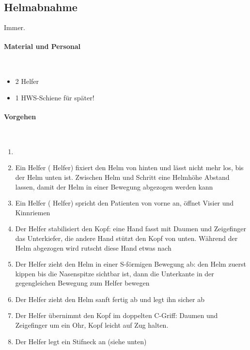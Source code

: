 \subsection{Helmabnahme}
\label{topic:helmabnahme}

Immer.

\paragraph*{Material und Personal}~

\begin{itemize}
\item 2 Helfer
\item 1 HWS-Schiene für später!
\end{itemize}

\paragraph*{Vorgehen}~

\begin{enumerate}
    \item {}
    \item Ein Helfer ( Helfer) fixiert den Helm von hinten und lässt nicht mehr los,
    bis der Helm unten ist. Zwischen Helm und Schritt eine Helmhöhe
    Abstand lassen, damit der Helm in einer Bewegung abgezogen werden kann
    \item Ein Helfer ( Helfer) spricht den Patienten von vorne an, öffnet Visier und
    Kinnriemen
    \item Der  Helfer stabilisiert den Kopf: eine Hand fasst mit
    Daumen und Zeigefinger das Unterkiefer, die andere Hand stützt den
    Kopf von unten. Während der Helm abgezogen wird rutscht diese Hand
    etwas nach
    \item Der  Helfer zieht den Helm in einer S-förmigen Bewegung
    ab: den Helm zuerst kippen bis die Nasenspitze sichtbar ist, dann die
    Unterkante in der gegengleichen Bewegung zum Helfer bewegen
    \item Der  Helfer zieht den Helm sanft fertig ab und legt ihn
    sicher ab
    \item Der  Helfer übernimmt den Kopf im doppelten C-Griff:
    Daumen und Zeigefinger um ein Ohr, Kopf leicht auf Zug halten.
    \item Der  Helfer legt ein Stifneck an (siehe unten)
\end{enumerate}

